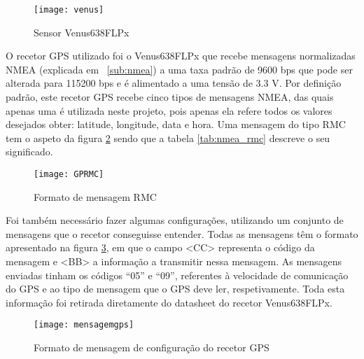 \begin{figure}[hbtp]
	\centering
	\texttt{[image: venus]}
	\caption[Sensor Venus638FLPx]{Sensor Venus638FLPx \footnotemark}
	\label{fig:sensor_venus638FLPx}
\end{figure}


O recetor GPS utilizado foi o Venus638FLPx que recebe mensagens normalizadas NMEA (explicada em ~\ref{sub:nmea}) a uma taxa padrão de 9600 bps que pode ser alterada para 115200 bps e é alimentado a uma tensão de 3.3 V.
Por definição padrão, este recetor GPS recebe cinco tipos de mensagens NMEA, das quais apenas uma é utilizada neste projeto, pois apenas ela refere todos os valores desejados obter: latitude, longitude, data e hora.
Uma mensagem do tipo RMC tem o aspeto da figura \ref{fig:formato_de_mensagem_rmc} sendo que a tabela \ref{tab:nmea_rmc} descreve o seu significado.

\begin{figure}[hbtp]
	\centering
	\texttt{[image: GPRMC]}
	\caption{Formato de mensagem RMC}
	\label{fig:formato_de_mensagem_rmc}
\end{figure}

Foi também necessário fazer algumas configurações, utilizando um conjunto de mensagens que o recetor conseguisse entender.
Todas as mensagens têm o formato apresentado na figura \ref{fig:formato_de_mensagem_de_configuracao_do_recetor_gps}, em que o campo <CC> representa o código da mensagem e <BB> a informação a transmitir nessa mensagem.
As mensagens enviadas tinham os códigos ``05'' e ``09'', referentes à velocidade de comunicação do GPS e ao tipo de mensagem que o GPS deve ler, respetivamente.
Toda esta informação foi retirada diretamente do datasheet do recetor Venus638FLPx.

\begin{figure}[hbtp]
	\centering
	\texttt{[image: mensagemgps]}
	\caption{Formato de mensagem de configuração do recetor GPS}
	\label{fig:formato_de_mensagem_de_configuracao_do_recetor_gps}
\end{figure}

